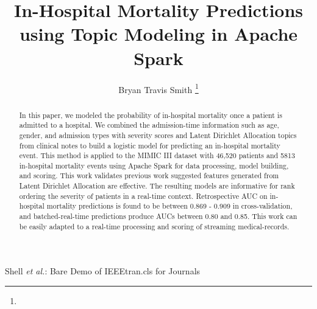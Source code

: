 \documentclass[journal]{IEEEtran}
\begin{document}
%
\title{In-Hospital Mortality Predictions using Topic Modeling in Apache Spark}
%
%
%

\author{Bryan Travis Smith
\thanks{}}


%
{Shell \MakeLowercase{\textit{et al.}}: Bare Demo of IEEEtran.cls for Journals}

\maketitle

\begin{abstract}
In this paper, we modeled the probability of in-hospital mortality once a patient is admitted to a hospital.  We combined the admission-time information such as age, gender, and admission types with severity scores and Latent Dirichlet Allocation topics from clinical notes to build a logistic model for predicting an in-hospital mortality event.   This method is applied to the MIMIC III dataset with 46,520 patients and 5813 in-hospital mortality events using Apache Spark for data processing, model building, and scoring.  This work validates previous work suggested features generated from Latent Dirichlet Allocation are effective.  The resulting models are informative for rank ordering the severity of patients in a real-time context.  Retrospective AUC on in-hospital mortality predictions is found to be between 0.869 - 0.909 in cross-validation, and batched-real-time predictions produce AUCs between 0.80 and 0.85.  This work can be easily adapted to a real-time processing and scoring of streaming medical-records.   
\end{abstract}
\end{document}
